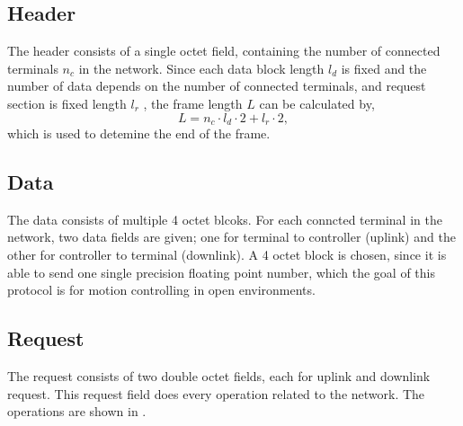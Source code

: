 ﻿\documentclass[twocolumn,9pt]{ltjsarticle}
\renewcommand{\ref}{\Cref}
\begin{document}



\subsection{Header}
The header consists of a single octet field, containing the number of connected terminals $n_{c}$ in the network.
Since each data block length $l_d$ is fixed and the number of data depends on the number of connected terminals, and request section is fixed length $l_r$ , the frame length $L$ can be calculated by,
\begin{equation}
  \label{}
  L = n_c \cdot l_d \cdot 2 + l_r \cdot 2,
\end{equation}
which is used to detemine the end of the frame.

\subsection{Data}
The data consists of multiple 4 octet blcoks.
For each conncted terminal in the network, two data fields are given; one for terminal to controller (uplink) and the other for controller to terminal (downlink).
A 4 octet block is chosen, since it is able to send one single precision floating point number, which the goal of this protocol is for motion controlling in open environments.

\subsection{Request}
The request consists of two double octet fields, each for uplink and downlink request.
This request field does every operation related to the network.
The operations are shown in \ref{tab:request}.
\end{document}
